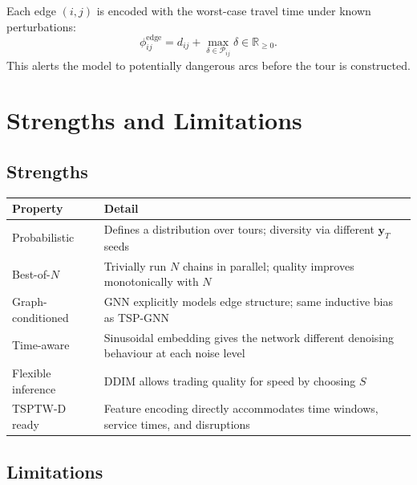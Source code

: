 \documentclass[12pt,a4paper]{article}
\begin{document}
Each edge $(i,j)$ is encoded with the worst-case travel time under known
perturbations:
\begin{equation}
  \phi_{ij}^{\mathrm{edge}}
  = d_{ij} + \max_{\delta \in \mathcal{P}_{ij}} \delta \in \mathbb{R}_{\geq 0}.
  \label{eq:edge_feats}
\end{equation}
This alerts the model to potentially dangerous arcs before the tour is
constructed.

\section{Strengths and Limitations}

\subsection*{Strengths}

\begin{center}
\begin{tabular}{lp{9.5cm}}
\toprule
\textbf{Property} & \textbf{Detail} \\
\midrule
Probabilistic & Defines a distribution over tours; diversity via different
  $\mathbf{y}_T$ seeds \\
Best-of-$N$ & Trivially run $N$ chains in parallel; quality improves
  monotonically with $N$ \\
Graph-conditioned & GNN explicitly models edge structure; same inductive bias
  as TSP-GNN \\
Time-aware & Sinusoidal embedding gives the network different denoising
  behaviour at each noise level \\
Flexible inference & DDIM allows trading quality for speed by choosing $S$ \\
TSPTW-D ready & Feature encoding directly accommodates time windows,
  service times, and disruptions \\
\bottomrule
\end{tabular}
\end{center}

\subsection*{Limitations}
\end{document}
